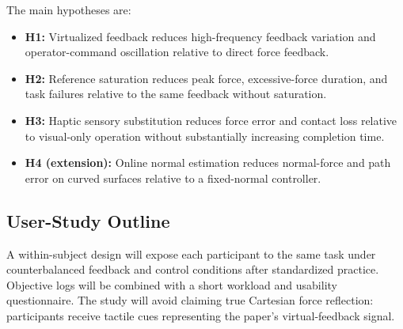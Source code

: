 \documentclass[journal]{IEEEtran}
\begin{document}
The main hypotheses are:
\begin{itemize}
\item \textbf{H1:} Virtualized feedback reduces high-frequency feedback variation and operator-command oscillation relative to direct force feedback.
\item \textbf{H2:} Reference saturation reduces peak force, excessive-force duration, and task failures relative to the same feedback without saturation.
\item \textbf{H3:} Haptic sensory substitution reduces force error and contact loss relative to visual-only operation without substantially increasing completion time.
\item \textbf{H4 (extension):} Online normal estimation reduces normal-force and path error on curved surfaces relative to a fixed-normal controller.
\end{itemize}

\subsection{User-Study Outline}
A within-subject design will expose each participant to the same task under counterbalanced feedback and control conditions after standardized practice. Objective logs will be combined with a short workload and usability questionnaire. The study will avoid claiming true Cartesian force reflection: participants receive tactile cues representing the paper's virtual-feedback signal.
\end{document}
